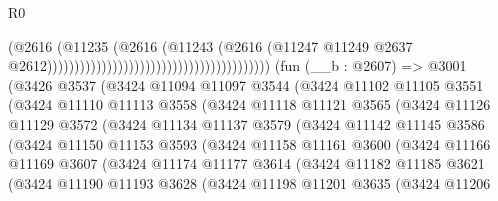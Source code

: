 \begin{lexlean}{R0}
\begin{coremodule}
                                                                          (@2616
                                                                            (@11235
                                                                              (@2616
                                                                                (@11243
                                                                                  (@2616
                                                                                    (@11247
                                                                                      @11249
                                                                                      @2637
                                                                                      @2612)))))))))))))))))))))))))))))))))))))))))
    (fun (__b : @2607) =>
    @3001
      (@3426
        @3537
        (@3424
          @11094
          @11097
          @3544
          (@3424
            @11102
            @11105
            @3551
            (@3424
              @11110
              @11113
              @3558
              (@3424
                @11118
                @11121
                @3565
                (@3424
                  @11126
                  @11129
                  @3572
                  (@3424
                    @11134
                    @11137
                    @3579
                    (@3424
                      @11142
                      @11145
                      @3586
                      (@3424
                        @11150
                        @11153
                        @3593
                        (@3424
                          @11158
                          @11161
                          @3600
                          (@3424
                            @11166
                            @11169
                            @3607
                            (@3424
                              @11174
                              @11177
                              @3614
                              (@3424
                                @11182
                                @11185
                                @3621
                                (@3424
                                  @11190
                                  @11193
                                  @3628
                                  (@3424
                                    @11198
                                    @11201
                                    @3635
                                    (@3424
                                      @11206

\end{coremodule}
\end{lexlean}
